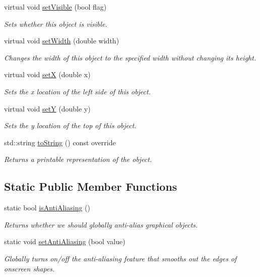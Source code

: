 \begin{DoxyCompactItemize}
virtual void \mbox{\hyperlink{classsgl_1_1GObject_a88203f28224315d9f4471212f4af8ed3}{set\+Visible}} (bool flag)
\begin{DoxyCompactList}\small\item\em Sets whether this object is visible. \end{DoxyCompactList}\item 
virtual void \mbox{\hyperlink{classsgl_1_1GObject_aa3f3fba4cb131baa8696ba01e3bceca1}{set\+Width}} (double width)
\begin{DoxyCompactList}\small\item\em Changes the width of this object to the specified width without changing its height. \end{DoxyCompactList}\item 
virtual void \mbox{\hyperlink{classsgl_1_1GObject_a9c18fcc579333bf9653d13ad2b372e39}{setX}} (double x)
\begin{DoxyCompactList}\small\item\em Sets the x location of the left side of this object. \end{DoxyCompactList}\item 
virtual void \mbox{\hyperlink{classsgl_1_1GObject_a7d57e2a5c35d27feb58fd498a3cf82b9}{setY}} (double y)
\begin{DoxyCompactList}\small\item\em Sets the y location of the top of this object. \end{DoxyCompactList}\item 
std\+::string \mbox{\hyperlink{classsgl_1_1GCompound_ab6e28321ea84864a7d677dd35c59523a}{to\+String}} () const override
\begin{DoxyCompactList}\small\item\em Returns a printable representation of the object. \end{DoxyCompactList}\end{DoxyCompactItemize}
\subsection*{Static Public Member Functions}
\begin{DoxyCompactItemize}
\item 
static bool \mbox{\hyperlink{classsgl_1_1GObject_a93be0e1fe1b1bf1a1da732470c94f42b}{is\+Anti\+Aliasing}} ()
\begin{DoxyCompactList}\small\item\em Returns whether we should globally anti-\/alias graphical objects. \end{DoxyCompactList}\item 
static void \mbox{\hyperlink{classsgl_1_1GObject_a1e43371668ae850193cebedb44e1bbe3}{set\+Anti\+Aliasing}} (bool value)
\begin{DoxyCompactList}\small\item\em Globally turns on/off the anti-\/aliasing feature that smooths out the edges of onscreen shapes. \end{DoxyCompactList}\end{DoxyCompactItemize}
